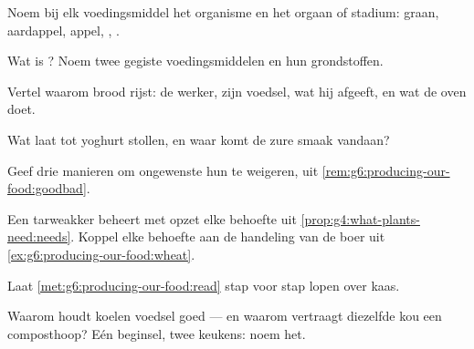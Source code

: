 \begin{exercise}[$\star$]\label{exo:g6:producing-our-food:2}
Noem bij elk voedingsmiddel het organisme en het orgaan of stadium:
graan, aardappel, appel, , .
\end{exercise}

\begin{exercise}[$\star$]\label{exo:g6:producing-our-food:3}
Wat is ? Noem twee gegiste voedingsmiddelen en hun grondstoffen.
\end{exercise}

\begin{exercise}[$\star$]\label{exo:g6:producing-our-food:4}
Vertel waarom brood rijst: de werker, zijn voedsel, wat hij afgeeft, en
wat de oven doet.
\end{exercise}

\begin{exercise}[$\star$]\label{exo:g6:producing-our-food:5}
Wat laat  tot yoghurt stollen, en waar komt de zure smaak vandaan?
\end{exercise}

\begin{exercise}[$\star$]\label{exo:g6:producing-our-food:6}
Geef drie manieren om ongewenste  hun  te weigeren,
uit \cref{rem:g6:producing-our-food:goodbad}.
\end{exercise}

\begin{exercise}[$\star\star$]\label{exo:g6:producing-our-food:7}
Een tarweakker beheert met opzet elke behoefte uit
\cref{prop:g4:what-plants-need:needs}. Koppel elke behoefte aan de
handeling van de boer uit \cref{ex:g6:producing-our-food:wheat}.
\end{exercise}

\begin{exercise}[$\star\star$]\label{exo:g6:producing-our-food:8}
Laat \cref{met:g6:producing-our-food:read} stap voor stap lopen over kaas.
\end{exercise}

\begin{exercise}[$\star\star$]\label{exo:g6:producing-our-food:9}
Waarom houdt koelen voedsel goed --- en waarom vertraagt diezelfde kou
een composthoop? Eén beginsel, twee keukens: noem het.
\end{exercise}

